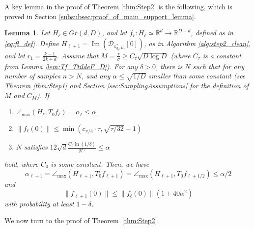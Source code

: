 \documentclass[12pt]{article}
\newtheorem{Lemma}[Theorem]{Lemma}
\theoremstyle{remark}
\newcommand{\RR}{\mathbb{R}}
\newcommand{\DD}{\mathcal{D}}
\newcommand{\maxangle}{\angle_{\max}}
\newcommand{\stau}{\tau}
\newcommand{\sM}{{M}}
\DeclareMathOperator{\Ima}{Im}
\begin{document}
A key lemma in the proof of Theorem \ref{thm:Step2} is the following, which is proved in Section \ref{subsubsec:proof_of_main_support_lemma}.

\begin{Lemma} \label{lem:main_support_theorem_step2}
	Let $H_\ell\in Gr(d, D)$, and let $f_\ell:H_\ell\simeq\RR^d \rightarrow \RR^{D-d}$, defined as in \eqref{eq:fl_def}. Define $H_{\ell+1} = \Ima(\DD_{\pi^*_{q_\ell,H_{\ell}}}[0])$, as in Algorithm \ref{alg:step2_clean}, and let $r_1 = \frac{k-1}{2k +d}$. 
	Assume that $M = \frac{\tau}{\sigma} \geq C_\stau \sqrt{D\log D}$ (where $C_\stau$ is a constant from Lemma \ref{lem:Tf_TtildeF_D}).
	For any $\delta>0$, there is $N$ such that for any number of samples $n>N$, and any $\alpha \leq\sqrt{1/D}$ smaller than some constant \emph{(}see Theorem \ref{thm:Step1} and Section \ref{sec:SamplingAssumptions} for the definition of $M$ and $C_\sM$\emph{)}.  If
	\begin{enumerate}
		\item $\maxangle (H_\ell, T_0 f_\ell) = \alpha_\ell\leq \alpha$
		\item $\|f_\ell(0)\| \leq \min (c_{\pi/4} \cdot \tau, \sqrt{\tau/32} -1) $
		\item $N$ satisfies $ 12\sqrt{d} \frac{C_0 \ln(1/\delta)}{N^{r_1}}\leq \alpha $ 
	\end{enumerate}
	hold, where $C_0$ is some constant. Then, we have  
	\[
	\alpha_{\ell+1} = \maxangle (H_{\ell+1}, T_0 f_{\ell+1})  = \maxangle (H_{\ell+1}, T_0 f_{\ell+1/2}) \leq \alpha/2
	\]
	and
	\[
	\|f_{\ell+1}(0)\| \leq \|f_\ell(0)\|\left(1+40\alpha^2\right) 
	\]
	with probability at least $1-\delta$.
\end{Lemma}
We now turn to the proof of Theorem~\ref{thm:Step2}.
\end{document}

